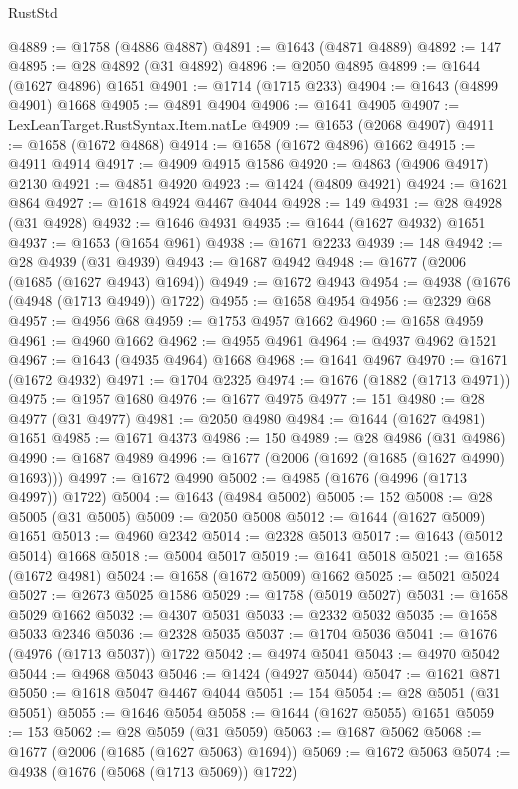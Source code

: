 \begin{lexlean}{RustStd}
\begin{coremodule}
@4889 := @1758 (@4886 @4887)
@4891 := @1643 (@4871 @4889)
@4892 := 147
@4895 := @28 @4892 (@31 @4892)
@4896 := @2050 @4895
@4899 := @1644 (@1627 @4896) @1651
@4901 := @1714 (@1715 @233)
@4904 := @1643 (@4899 @4901) @1668
@4905 := @4891 @4904
@4906 := @1641 @4905
@4907 := LexLeanTarget.RustSyntax.Item.natLe
@4909 := @1653 (@2068 @4907)
@4911 := @1658 (@1672 @4868)
@4914 := @1658 (@1672 @4896) @1662
@4915 := @4911 @4914
@4917 := @4909 @4915 @1586
@4920 := @4863 (@4906 @4917) @2130
@4921 := @4851 @4920
@4923 := @1424 (@4809 @4921)
@4924 := @1621 @864
@4927 := @1618 @4924 @4467 @4044
@4928 := 149
@4931 := @28 @4928 (@31 @4928)
@4932 := @1646 @4931
@4935 := @1644 (@1627 @4932) @1651
@4937 := @1653 (@1654 @961)
@4938 := @1671 @2233
@4939 := 148
@4942 := @28 @4939 (@31 @4939)
@4943 := @1687 @4942
@4948 := @1677 (@2006 (@1685 (@1627 @4943) @1694))
@4949 := @1672 @4943
@4954 := @4938 (@1676 (@4948 (@1713 @4949)) @1722)
@4955 := @1658 @4954
@4956 := @2329 @68
@4957 := @4956 @68
@4959 := @1753 @4957 @1662
@4960 := @1658 @4959
@4961 := @4960 @1662
@4962 := @4955 @4961
@4964 := @4937 @4962 @1521
@4967 := @1643 (@4935 @4964) @1668
@4968 := @1641 @4967
@4970 := @1671 (@1672 @4932)
@4971 := @1704 @2325
@4974 := @1676 (@1882 (@1713 @4971))
@4975 := @1957 @1680
@4976 := @1677 @4975
@4977 := 151
@4980 := @28 @4977 (@31 @4977)
@4981 := @2050 @4980
@4984 := @1644 (@1627 @4981) @1651
@4985 := @1671 @4373
@4986 := 150
@4989 := @28 @4986 (@31 @4986)
@4990 := @1687 @4989
@4996 := @1677 (@2006 (@1692 (@1685 (@1627 @4990) @1693)))
@4997 := @1672 @4990
@5002 := @4985 (@1676 (@4996 (@1713 @4997)) @1722)
@5004 := @1643 (@4984 @5002)
@5005 := 152
@5008 := @28 @5005 (@31 @5005)
@5009 := @2050 @5008
@5012 := @1644 (@1627 @5009) @1651
@5013 := @4960 @2342
@5014 := @2328 @5013
@5017 := @1643 (@5012 @5014) @1668
@5018 := @5004 @5017
@5019 := @1641 @5018
@5021 := @1658 (@1672 @4981)
@5024 := @1658 (@1672 @5009) @1662
@5025 := @5021 @5024
@5027 := @2673 @5025 @1586
@5029 := @1758 (@5019 @5027)
@5031 := @1658 @5029 @1662
@5032 := @4307 @5031
@5033 := @2332 @5032
@5035 := @1658 @5033 @2346
@5036 := @2328 @5035
@5037 := @1704 @5036
@5041 := @1676 (@4976 (@1713 @5037)) @1722
@5042 := @4974 @5041
@5043 := @4970 @5042
@5044 := @4968 @5043
@5046 := @1424 (@4927 @5044)
@5047 := @1621 @871
@5050 := @1618 @5047 @4467 @4044
@5051 := 154
@5054 := @28 @5051 (@31 @5051)
@5055 := @1646 @5054
@5058 := @1644 (@1627 @5055) @1651
@5059 := 153
@5062 := @28 @5059 (@31 @5059)
@5063 := @1687 @5062
@5068 := @1677 (@2006 (@1685 (@1627 @5063) @1694))
@5069 := @1672 @5063
@5074 := @4938 (@1676 (@5068 (@1713 @5069)) @1722)

\end{coremodule}
\end{lexlean}
